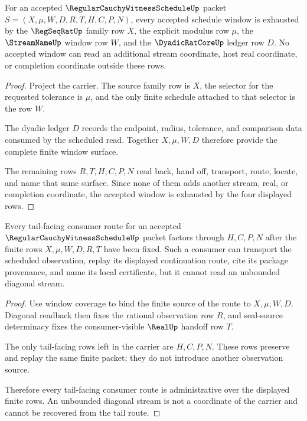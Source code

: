 \begin{theorem}
\label{thm:regularcauchywitnessschedule-window-coverage}
For an accepted $\RegularCauchyWitnessScheduleUp$ packet $S=(X,\mu,W,D,R,T,H,C,P,N)$, every accepted schedule window is exhausted by the $\RegSeqRatUp$ family row $X$, the explicit modulus row $\mu$, the $\StreamNameUp$ window row $W$, and the $\DyadicRatCoreUp$ ledger row $D$. No accepted window can read an additional stream coordinate, host real coordinate, or completion coordinate outside these rows.
\end{theorem}
\begin{proof}
Project the carrier. The source family row is $X$, the selector for the requested tolerance is $\mu$, and the only finite schedule attached to that selector is the row $W$.

The dyadic ledger $D$ records the endpoint, radius, tolerance, and comparison data consumed by the scheduled read. Together $X,\mu,W,D$ therefore provide the complete finite window surface.

The remaining rows $R,T,H,C,P,N$ read back, hand off, transport, route, locate, and name that same surface. Since none of them adds another stream, real, or completion coordinate, the accepted window is exhausted by the four displayed rows.
\end{proof}

\begin{theorem}
\label{thm:regularcauchywitnessschedule-tail-route}
Every tail-facing consumer route for an accepted $\RegularCauchyWitnessScheduleUp$ packet factors through $H,C,P,N$ after the finite rows $X,\mu,W,D,R,T$ have been fixed. Such a consumer can transport the scheduled observation, replay its displayed continuation route, cite its package provenance, and name its local certificate, but it cannot read an unbounded diagonal stream.
\end{theorem}
\begin{proof}
Use window coverage to bind the finite source of the route to $X,\mu,W,D$. Diagonal readback then fixes the rational observation row $R$, and seal-source determinacy fixes the consumer-visible $\RealUp$ handoff row $T$.

The only tail-facing rows left in the carrier are $H,C,P,N$. These rows preserve and replay the same finite packet; they do not introduce another observation source.

Therefore every tail-facing consumer route is administrative over the displayed finite rows. An unbounded diagonal stream is not a coordinate of the carrier and cannot be recovered from the tail route.
\end{proof}

